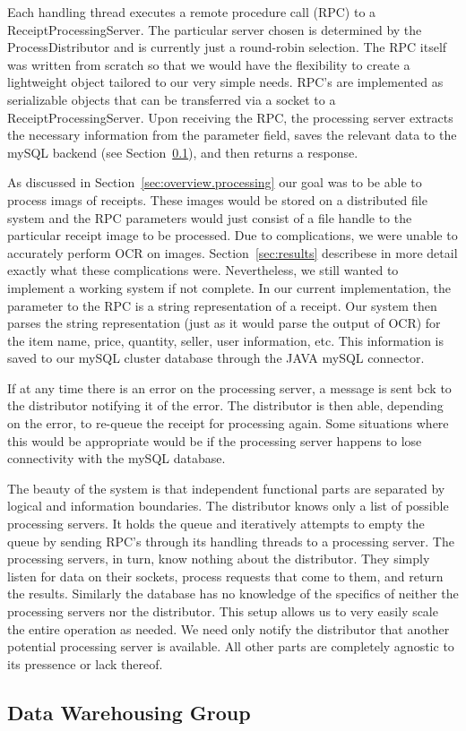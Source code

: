 Each handling thread executes a remote procedure call (RPC) to a
ReceiptProcessingServer. The particular server chosen is determined by
the ProcessDistributor and is currently just a round-robin
selection. The RPC itself was written from scratch so that we would
have the flexibility to create a lightweight object tailored to our
very simple needs. RPC's are implemented as serializable objects that
can be transferred via a socket to a ReceiptProcessingServer. Upon
receiving the RPC, the processing server extracts the necessary
information from the parameter field, saves the relevant data to the
mySQL backend (see Section~\ref{sec:implementation.db}), and then
returns a response.

As discussed in Section~\ref{sec:overview.processing} our goal was to
be able to process imags of receipts. These images would be stored on
a distributed file system and the RPC parameters would just consist of
a file handle to the particular receipt image to be processed. Due to
complications, we were unable to accurately perform OCR on
images. Section~\ref{sec:results} describese in more detail exactly
what these complications were. Nevertheless, we still wanted to
implement a working system if not complete. In our current
implementation, the parameter to the RPC is a string representation of
a receipt. Our system then parses the string representation (just as
it would parse the output of OCR) for the item name, price, quantity,
seller, user information, etc. This information is saved to our mySQL
cluster database through the JAVA mySQL connector.

If at any time there is an error on the processing server, a message
is sent bck to the distributor notifying it of the error. The
distributor is then able, depending on the error, to re-queue the
receipt for processing again. Some situations where this would be
appropriate would be if the processing server happens to lose
connectivity with the mySQL database.

The beauty of the system is that independent functional parts are
separated by logical and information boundaries. The distributor knows
only a list of possible processing servers. It holds the queue and
iteratively attempts to empty the queue by sending RPC's through its
handling threads to a processing server. The processing servers, in
turn, know nothing about the distributor. They simply listen for data
on their sockets, process requests that come to them, and return the
results. Similarly the database has no knowledge of the specifics of
neither the processing servers nor the distributor. This setup allows
us to very easily scale the entire operation as needed. We need only
notify the distributor that another potential processing server is
available. All other parts are completely agnostic to its pressence or
lack thereof.

\subsection{Data Warehousing Group}
\label{sec:implementation.db}

